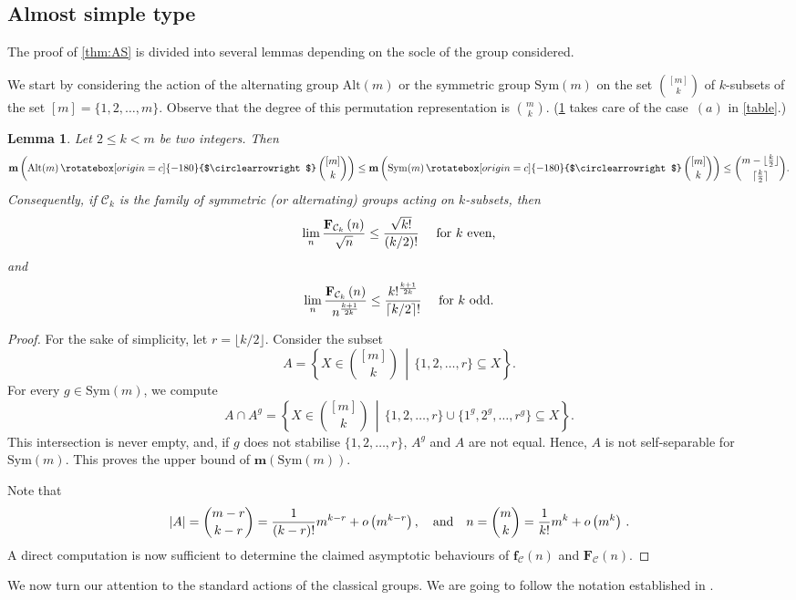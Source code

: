 \documentclass[a4paper]{amsart}
\newcommand{\Sym}{\mathrm{Sym}}
\newcommand{\Alt}{\mathrm{Alt}}
\newcommand{\f}{\mathbf{f}}
\newcommand{\F}{\mathbf{F}}
\newcommand{\m}{\mathbf{m}}
\newcommand{\C}{\mathcal{C}}
\newcommand{\act}{\,\rotatebox[origin=c]{-180}{$\circlearrowright$}\,}
\newtheorem{lemma}[theorem]{Lemma}
\theoremstyle{definition}
\begin{document}
\subsection{Almost simple type} \label{sec:AS}
The proof of \cref{thm:AS} is divided into  several lemmas depending on the socle of the group considered.

We start by considering the action of the alternating group $\Alt(m)$ or the symmetric group $\Sym(m)$ on the set ${[m] \choose k}$ of $k$-subsets of the set $[m]=\{1,2,\ldots,m\}$. Observe that the degree of this permutation representation is ${m \choose k}$. (\cref{thm:ksets} takes care of the case~$(a)$ in \cref{table}.)
\begin{lemma}
\label{thm:ksets}
Let $2\le k < m$ be two integers. Then
$$\m\left( \Alt(m) \act {[m] \choose k} \right) \le \m\left( \Sym(m) \act {[m] \choose k} \right) \le {m-\lfloor \frac{k}{2} \rfloor \choose \lceil \frac{k}{2} \rceil}.$$
Consequently, if $\C_k$ is the family of symmetric (or alternating) groups acting on $k$-subsets, then
\[ \lim_n\frac{\F_{\C_k}\left(n\right)}{\sqrt{n}} \le \frac{\sqrt{k!}}{(k/2)!} \quad \hbox{ for } k \hbox{ even,}\]
and
\[ \lim_n\frac{\F_{\C_k}\left(n\right)}{n^{\frac{k+1}{2k}}} \le \frac{k!^{\frac{k+1}{2k}}}{\lceil k/2 \rceil!} \quad \hbox{ for } k \hbox{ odd} .\]
\end{lemma}

\begin{proof}
For the sake of simplicity, let $r = \lfloor k/2 \rfloor$.
Consider the subset
$$A = \left\{ X \in {[m]\choose k} \,\middle\vert\, \{1,2,\ldots,r\} \subseteq X\right\}.$$
For every $g\in \Sym(m)$, we compute
\[ A \cap A^g = \left\{ X \in {[m]\choose k} \,\middle\vert\, \{1,2,\ldots,r\} \cup \{1^g,2^g,\ldots,r^g\} \subseteq X\right\}.\]
This intersection is never empty, and, if $g$ does not stabilise $\{1,2,\ldots,r\}$, $A^g$ and $A$ are not equal. Hence, $A$ is not self-separable for $\Sym(m)$. This  proves the upper bound of $\m(\Sym(m))$.

Note that
\[ |A| = {m-r \choose k-r} = \frac{1}{(k-r)!}m^{k-r} + o \left(m^{k-r} \right), \quad \hbox{and} \quad n = {m \choose k } = \frac{1}{k!}m^{k} + o \left(m^{k} \right) \,.\]
A direct computation is now sufficient to determine the claimed asymptotic behaviours of $\f_\C(n)$ and $\F_\C(n)$.
\end{proof}

We now turn our attention to the standard actions of the classical groups. We are going to follow the notation established in \cite[Chapters~2 and~4]{BurnessGiudici2016}.
\end{document}
